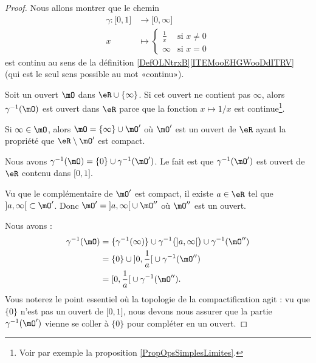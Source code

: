 \begin{proof}
	Nous allons montrer que le chemin
	\begin{equation}
		\begin{aligned}
			\gamma\colon \mathopen[ 0 , 1 \mathclose] & \to \mathopen[ 0 , \infty \mathclose] \\
			x                                         & \mapsto \begin{cases}
				\frac{1}{ x } & \text{si } x\neq 0 \\
				\infty        & \text{si } x=0
			\end{cases}
		\end{aligned}
	\end{equation}
	est continu au sens de la définition \ref{DefOLNtrxB}\ref{ITEMooEHGWooDdITRV} (qui est le seul sens possible au mot «continu»).

	Soit un ouvert \( \mO\) dans \( \eR\cup\{ \infty \}\). Si cet ouvert ne contient pas \( \infty\), alors \( \gamma^{-1}(\mO)\) est ouvert dans \( \eR\) parce que la fonction \( x\mapsto 1/x\) est continue\footnote{Voir par exemple la proposition \ref{PropOpsSimplesLimites}.}.

	Si \( \infty\in\mO\), alors \( \mO=\{ \infty \}\cup \mO'\) où \( \mO'\) est un ouvert de \( \eR\) ayant la propriété que \( \eR\setminus \mO'\) est compact.

	Nous avons \( \gamma^{-1}(\mO)=\{ 0 \}\cup\gamma^{-1}(\mO')\). Le fait est que \( \gamma^{-1}(\mO')\) est ouvert de \( \eR\) contenu dans \( \mathopen[ 0 , 1 \mathclose]\).

	Vu que le complémentaire de \( \mO'\) est compact, il existe \( a\in \eR\) tel que \( \mathopen] a , \infty \mathclose[\subset \mO'\). Donc \( \mO'=\mathopen] a , \infty \mathclose[\cup\mO''\) où \( \mO''\) est un ouvert.

	Nous avons :
	\begin{subequations}
		\begin{align}
			\gamma^{-1}(\mO) & =\{ \gamma^{-1}(\infty) \}\cup \gamma^{-1}\big( \mathopen] a , \infty \mathclose[ \big)\cup \gamma^{-1}(\mO'') \\
			                 & =\{ 0 \}\cup\mathopen] 0 , \frac{1}{  a } \mathclose[\cup\gamma^{-1}(\mO'')                                    \\
			                 & =\mathopen[ 0 , \frac{1}{ a } \mathclose[\cup\gamma^{-1}(\mO'').
		\end{align}
	\end{subequations}
	Vous noterez le point essentiel où la topologie de la compactification agit : vu que \( \{0\}\) n'est pas un ouvert de \( \mathopen[ 0 , 1 \mathclose]\), nous devons nous assurer que la partie \( \gamma^{-1}(\mO')\) vienne se coller à \( \{0\}\) pour compléter en un ouvert.


\end{proof}
